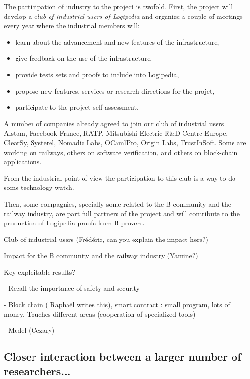 The participation of industry to the project is twofold. First, the
project will develop a {\em club of industrial users of Logipedia} and
organize a couple of meetings every year where the industrial members
will:
\begin{itemize}
\item learn about the advancement and new features of the infrastructure,
\item give feedback on the use of the infrastructure,
\item provide tests sets and proofs to include into Logipedia,
\item propose new features, services or research directions for the projet,
\item participate to the project self assessment.
\end{itemize}

A number of companies already agreed to join our
club of industrial users
Alstom,
Facebook France,
RATP, Mitsubishi Electric R\&D Centre Europe, ClearSy,
Systerel, Nomadic Labs, OCamlPro, Origin Labs, TrustInSoft.
Some are
working on railways, others on software verification, and others on
block-chain applications.

From the industrial point of view the participation to this club
is a way to do some technology watch. 

Then, some compagnies, specially some related to the {\sf B} community
and the railway industry, are part full partners of the project and
will contribute to the production of {\sf Logipedia} proofs from
{\sf B} provers. 

{\color{red} Club of industrial users (Frédéric, can 
you explain the impact here?)}

{\color{red} Impact for the {\sf B} community and the railway industry
  (Yamine?)}

{\color{red} Key exploitable results?}

- Recall the importance of safety and security

- Block chain ({\color{red} Raphaël writes this}), smart contract : small program, lots of money. Touches different areas (cooperation of specialized tools)

- Medel (Cezary)



\subsection{Closer interaction between a larger number of researchers...}


